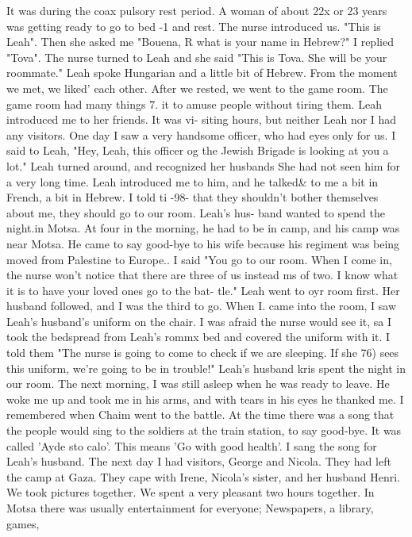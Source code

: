 It was during the coax{ 
pulsory rest period.
A woman of about 22x or 23 years was getting ready to go to bed -1 
and rest.
The nurse introduced us.
"This is Leah".
Then she asked me "Bouena, R what 
is your name in Hebrew?"
I replied "Tova".
The nurse turned to Leah and she said 
"This is Tova.
She will be your roommate."
Leah spoke Hungarian and a little bit of Hebrew.
From the moment we met, we liked' 
each other.
After we rested, we went to the game room.
The game room had many things 7. 
it to amuse people without tiring them.
Leah introduced me to her friends.
It was vi-
siting hours, but neither Leah nor I had any visitors.
One day I saw a very handsome officer, who had eyes only for us.
I said to Leah, 
"Hey, Leah, this officer og the Jewish Brigade is looking at you a lot."
Leah turned 
around, and recognized her husbands She had not seen him for a very long time.
Leah 
introduced me to him, and he talked& to me a bit in French, a bit in Hebrew.
I told ti 
-98- 
that they shouldn't bother themselves about me, they should go to our room.
Leah's hus-
band wanted to spend the night.in Motsa.
At four in the morning, he had to be in camp, 
and his camp was near Motsa.
He came to say good-bye to his wife because his regiment 
was being moved from Palestine to Europe.. 
I said "You go to our room.
When I come in, the nurse won't notice that there are 
three of us instead ms of two.
I know what it is to have your loved ones go to the bat-
tle."
Leah went to oyr room first.
Her husband followed, and I was the third to go.
When I. came into the room, I saw Leah's husband's uniform on the chair.
I was afraid the 
nurse would see it, sa I took the bedspread from Leah's rommx bed and covered the uniform 
with it.
I told them "The nurse is going to come to check if we are sleeping.
If she 
76) 
sees this uniform, we're going to be in trouble!"
Leah's husband kris spent the night in our room.
The next morning, I was still asleep 
when he was ready to leave.
He woke me up and took me in his arms, and with tears in his 
eyes he thanked me.
I remembered when Chaim went to the battle.
At the time there was 
a song that the people would sing to the soldiers at the train station, to say good-bye.
It was called 'Ayde sto calo'.
This means 'Go with good health'.
I sang the song for 
Leah's husband.
The next day I had visitors, George and Nicola.
They had left the camp at Gaza.
They 
cape with Irene, Nicola's sister, and her husband Henri.
We took pictures together.
We 
spent a very pleasant two hours together.
In Motsa there was usually entertainment for everyone; Newspapers, a library, games, 
}
